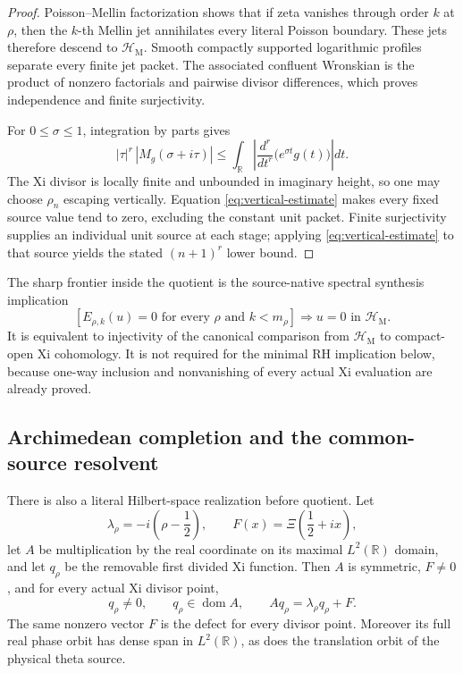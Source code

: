 \documentclass[11pt]{article}
\theoremstyle{definition}
\theoremstyle{remark}
\newcommand{\R}{\mathbb R}
\newcommand{\cH}{\mathcal H}
\newcommand{\dom}{\operatorname{dom}}
\begin{document}
\begin{proof}
Poisson--Mellin factorization shows that if zeta vanishes through order
\(k\) at \(\rho\), then the \(k\)-th Mellin jet annihilates every literal
Poisson boundary.  These jets therefore descend to
\(\cH_{\mathrm M}\).  Smooth compactly supported logarithmic profiles
separate every finite jet packet.  The associated confluent Wronskian is
the product of nonzero factorials and pairwise divisor differences, which
proves independence and finite surjectivity.

For \(0\le\sigma\le1\), integration by parts gives
\[
 |\tau|^r\,|M_g(\sigma+i\tau)|
 \le
 \int_{\R}\left|
   \frac{d^r}{dt^r}\bigl(e^{\sigma t}g(t)\bigr)
 \right|dt.
\tag{5.2}\label{eq:vertical-estimate}
\]
The Xi divisor is locally finite and unbounded in imaginary height, so
one may choose \(\rho_n\) escaping vertically.  Equation
\eqref{eq:vertical-estimate} makes every fixed source value tend to zero,
excluding the constant unit packet.  Finite surjectivity supplies an
individual unit source at each stage; applying
\eqref{eq:vertical-estimate} to that source yields the stated
\((n+1)^r\) lower bound.
\end{proof}

The sharp frontier inside the quotient is the source-native spectral
synthesis implication
\[
\left[
 E_{\rho,k}(u)=0
 \text{ for every }\rho\text{ and }k<m_\rho
\right]
\Longrightarrow
u=0\text{ in }\cH_{\mathrm M}.
\tag{5.3}\label{eq:synthesis}
\]
It is equivalent to injectivity of the canonical comparison from
\(\cH_{\mathrm M}\) to compact-open Xi cohomology.  It is not required
for the minimal RH implication below, because one-way inclusion and
nonvanishing of every actual Xi evaluation are already proved.

\subsection{Archimedean completion and the common-source resolvent}

There is also a literal Hilbert-space realization before quotient.  Let
\[
 \lambda_\rho=-i\left(\rho-\frac12\right),\qquad
 F(x)=\Xi\!\left(\frac12+ix\right),
\]
let \(A\) be multiplication by the real coordinate on its maximal
\(L^2(\R)\) domain, and let \(q_\rho\) be the removable first divided Xi
function.  Then \(A\) is symmetric, \(F\ne0\), and for every actual Xi
divisor point,
\[
 q_\rho\ne0,\qquad q_\rho\in\dom A,\qquad
                       Aq_\rho=\lambda_\rho q_\rho+F.
\tag{5.4}\label{eq:common-source-resolvent}
\]
The same nonzero vector \(F\) is the defect for every divisor point.
Moreover its full real phase orbit has dense span in \(L^2(\R)\), as does
the translation orbit of the physical theta source.
\end{document}
